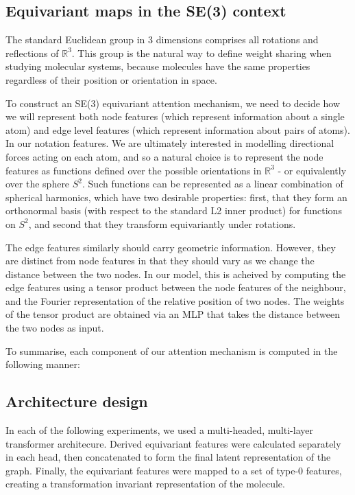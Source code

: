 \documentclass[11pt]{article}
\begin{document}
\subsection*{Equivariant maps in the SE(3) context}

The standard Euclidean group in 3 dimensions comprises all rotations and reflections of $\mathbb{R}^3$. This group is the natural way to define weight sharing when studying molecular systems, because molecules have the same properties regardless of their position or orientation in space.

To construct an SE(3) equivariant attention mechanism, we need to decide how we will represent both node features (which represent information about a single atom) and edge level features (which represent information about pairs of atoms). In our notation features. We are ultimately interested in modelling directional forces acting on each atom, and so a natural choice is to represent the node features as functions defined over the possible orientations in $\mathbb{R}^3$  - or equivalently over the sphere $S^2$. Such functions can be represented as a linear combination of spherical harmonics, which have two desirable properties: first, that they form an orthonormal basis (with respect to the standard L2 inner product) for functions on $S^2$, and second that they transform equivariantly under rotations.

The edge features similarly should carry geometric information. However, they are distinct from node features in that they should vary as we change the distance between the two nodes. In our model, this is acheived by computing the edge features using a tensor product between the node features of the neighbour, and the Fourier representation of the relative position of two nodes. The weights of the tensor product are obtained via an MLP that takes the distance between the two nodes as input.

To summarise, each component of our attention mechanism is computed in the following manner:



\subsection{Architecture design}

In each of the following experiments, we used a multi-headed, multi-layer transformer architecure. Derived equivariant features were calculated separately in each head, then concatenated to form the final latent representation of the graph. Finally, the equivariant features were mapped to a set of type-0 features, creating a transformation invariant representation of the molecule.
\end{document}
